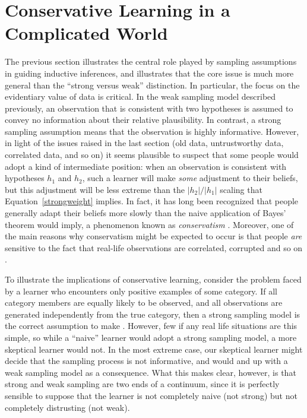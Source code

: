 \documentclass[doc]{apa6}
\begin{document}
\section{Conservative Learning in a Complicated World}

The previous section illustrates the central role played by sampling assumptions in guiding inductive inferences, and illustrates that the core issue is much more general than the ``strong versus weak'' distinction. In particular, the focus on the evidentiary value of data is critical. In the weak sampling model described previously, an observation that is consistent with two hypotheses is assumed to convey no information about their relative plausibility. In contrast, a strong sampling assumption means that the observation is highly informative. However, in light of the issues raised in the last section (old data, untrustworthy data, correlated data, and so on) it seems plausible to suspect that some people would adopt a kind of intermediate position: when an observation is consistent with hypotheses $h_1$ and $h_2$, such a learner will make {\it some} adjustment to their beliefs, but this adjustment will be less extreme than the $|h_2|/|h_1|$ scaling that Equation~\ref{strongweight} implies. In fact, it has long been recognized that people generally adapt their beliefs more slowly than the naive application of Bayes' theorem would imply, a phenomenon known as {\it conservatism} \cite{Phillips1966}. Moreover, one of the main reasons why conservatism might be expected to occur is that people {\it are} sensitive to the fact that real-life observations are correlated, corrupted and so on \cite{Navon1978}.

To illustrate the implications of conservative learning, consider the problem faced by a learner who encounters only positive examples of some category. If all category members are equally likely to be observed, and all observations are generated independently from the true category, then a strong sampling model is the correct assumption to make \cite{Tenenbaum2001}. However, few if any real life situations are this simple, so while a ``naive'' learner would adopt a strong sampling model, a more skeptical learner would not. In the most extreme case, our skeptical learner might decide that the sampling process is not informative, and would and up with a weak sampling model as a consequence. What this makes clear, however, is that strong and weak sampling are two ends of a continuum, since it is perfectly sensible to suppose that the learner is not completely naive (not strong) but not completely distrusting (not weak).
\end{document}
